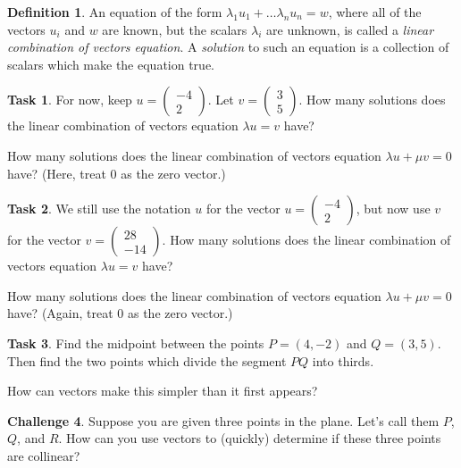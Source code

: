 \documentclass{tufte-book}
\theoremstyle{definition}
\newtheorem{task}{Task}
\newtheorem{challenge}[task]{Challenge}
\newtheorem*{definition}{Definition}
\begin{document}
\begin{definition}
An equation of the form $\lambda_1 u_1 + \dots \lambda_n u_n = w$, where all of the vectors $u_i$ and $w$ are known, but the scalars $\lambda_i$ are unknown, is called a \emph{linear combination of vectors equation}.
A \emph{solution} to such an equation is 
a collection of scalars which make the equation true.
\end{definition}

\begin{task}
For now, keep $u = \left(\begin{smallmatrix} -4 \\ 2\end{smallmatrix}\right)$. 
Let $v = \left(\begin{smallmatrix} 3 \\ 5 \end{smallmatrix}\right)$.
How many solutions does the linear combination of vectors equation
$\lambda u = v$
have?

How many solutions does the linear combination of vectors equation 
$\lambda u + \mu v = 0$
have? (Here, treat $0$ as the zero vector.)
\end{task}

\begin{task}
We still use the notation $u$ for the vector $u = \left(\begin{smallmatrix} -4 \\ 2\end{smallmatrix}\right)$, but now use $v$ for the vector $v = \left(\begin{smallmatrix} 28 \\ -14\end{smallmatrix}\right)$.
How many solutions does the linear combination of vectors equation $\lambda u = v$
have?

How many solutions does the linear combination of vectors equation 
$\lambda u + \mu v = 0$ have? (Again, treat $0$ as the zero vector.)
\end{task}

\begin{task}
Find the midpoint between the points $P = (4,-2)$ and $Q=(3,5)$. Then find the two points which divide the segment $PQ$ into thirds.

How can vectors make this simpler than it first appears?
\end{task}

\begin{challenge}
Suppose you are given three points in the plane. Let's call them $P$, $Q$, and $R$.
How can you use vectors to (quickly) determine if these three points are collinear?
\end{challenge}
\end{document}
